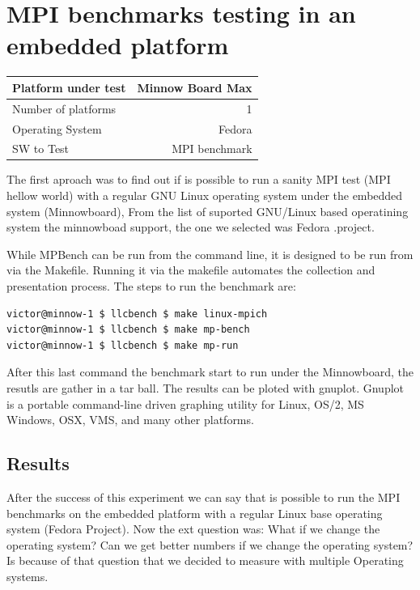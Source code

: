 \section{MPI benchmarks testing in an embedded platform}
    
    \begin{center}
    \begin{tabular}{ | l | r |}
        \hline
        Platform under test & Minnow Board  Max \\ \hline
        Number of platforms  & 1  \\ \hline
        Operating System & Fedora  \\ \hline
        SW to Test & MPI benchmark \\ \hline
    \end{tabular}
    \end{center}

The first aproach was to find out if is possible to run a sanity MPI test (MPI
hellow world) with a regular GNU Linux operating system under the embedded
system (Minnowboard\cite{minnowboard}),  From the list of suported GNU/Linux
based operatining system the minnowboad support, the one we selected was Fedora
\cite{fedora}.project. 


While MPBench can be run from the command line, it is designed to be run from
via the Makefile. Running it via the makefile automates the collection and
presentation process. The steps to run the benchmark are: 


\begin{lstlisting}[frame=single,language=bash]
victor@minnow-1 $ llcbench $ make linux-mpich
victor@minnow-1 $ llcbench $ make mp-bench
victor@minnow-1 $ llcbench $ make mp-run
\end{lstlisting}

After this last command the benchmark start to run under the Minnowboard, the
resutls are gather in a tar ball. The results can be ploted with gnuplot.
Gnuplot is a portable command-line driven graphing utility for Linux, OS/2, MS
Windows, OSX, VMS, and many other platforms. 

\subsection{Results}
After the success of this experiment we can say that is possible to run the MPI
benchmarks on the embedded platform with a regular Linux base operating system
(Fedora Project). Now the ext question was: What if we change the operating
system? Can we get better numbers if we change the operating system? Is because
of that question that we decided to measure with multiple Operating systems.


